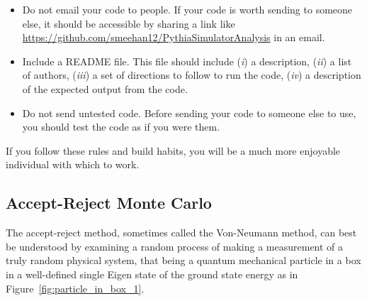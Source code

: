 \documentclass[UKenglish,texlive=2016]{\ATLASLATEXPATH atlasdoc}
\begin{document}
\begin{itemize}
\item Do not email your code to people.  If your code is worth sending to someone else, it should be accessible by sharing a link like \href{https://github.com/smeehan12/PythiaSimulatorAnalysis}{https://github.com/smeehan12/PythiaSimulatorAnalysis} in an email.  
\item Include a \textsc{README} file.  This file should include (\textit{i}) a description, (\textit{ii}) a list of authors, (\textit{iii}) a set of directions to follow to run the code, (\textit{iv}) a description of the expected output from the code.
\item Do not send untested code.  Before sending your code to someone else to use, you should test the code as if you were them.
\end{itemize}

If you follow these rules and build habits, you will be a much more enjoyable individual with which to work.


\subsection{Accept-Reject Monte Carlo}
The accept-reject method, sometimes called the Von-Neumann method, can best be understood by examining a random process of making a measurement of a truly random physical system, that being a quantum mechanical particle in a box in a well-defined single Eigen state of the ground state energy as in Figure~\ref{fig:particle_in_box_1}.  
\end{document}
